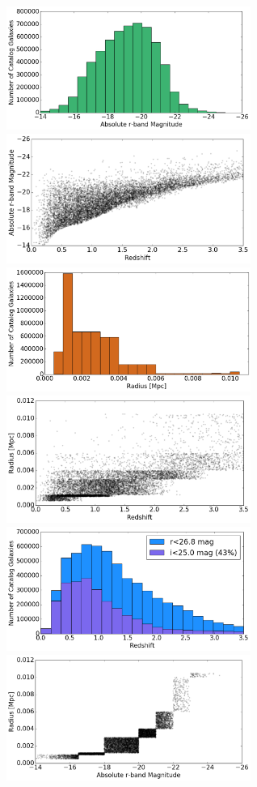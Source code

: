 \documentclass[DM,authoryear,toc]{lsstdoc}
\begin{document}
\begin{figure}[h]
\begin{center}
\includegraphics[width=8cm]{hg_Mr_dist.png}
\includegraphics[width=8cm]{hg_Mr_vs_z.png}
\includegraphics[width=8cm]{hg_rad_dist.png}
\includegraphics[width=8cm]{hg_rad_vs_z.png}
\includegraphics[width=8cm]{hg_z_dist.png}
\includegraphics[width=8cm]{hg_rad_vs_Mr.png}

\end{center}
\end{figure}
\end{document}
